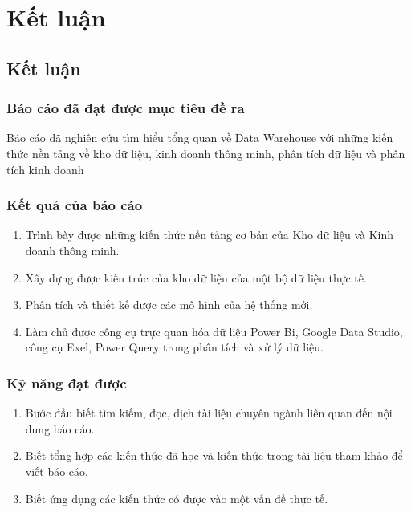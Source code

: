 \newpage                    %

\section*{Kết luận}

\subsection*{Kết luận}
\subsubsection*{Báo cáo đã đạt được mục tiêu đề ra} 
Báo cáo đã nghiên cứu tìm hiểu tổng quan về Data Warehouse với những kiến thức nền tảng về kho dữ liệu, kinh doanh thông minh, phân tích dữ liệu và phân tích kinh doanh

\subsubsection*{Kết quả của báo cáo} 
\begin{enumerate}
    \item Trình bày được những kiến thức nền tảng cơ bản của Kho dữ liệu và Kinh doanh thông minh.
    \item Xây dựng được kiến trúc của kho dữ liệu của một bộ dữ liệu thực tế.
\item Phân tích và thiết kế được các mô hình của hệ thống mới.
\item Làm chủ được công cụ trực quan hóa dữ liệu Power Bi, Google Data Studio, công cụ Exel, Power Query trong phân tích và xử lý dữ liệu.
\end{enumerate}

\subsubsection*{Kỹ năng đạt được}

\begin{enumerate}
	\item  Bước đầu biết tìm kiếm, đọc, dịch tài liệu chuyên ngành liên quan đến nội dung báo cáo.
	\item Biết tổng hợp các kiến thức đã học và kiến thức trong tài liệu tham khảo để viết báo cáo.
	\item Biết ứng dụng các kiến thức có được vào một vấn đề thực tế.
\end{enumerate}

